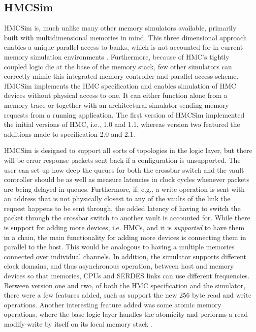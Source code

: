\subsection{HMCSim} \label{HMC-Sim}
HMCSim is, much unlike many other memory simulators available, primarily built with multidimensional memories in mind. This three dimensional approach enables a unique parallel access to banks, which is not accounted for in current memory simulation environments \cite{6969550}. Furthermore, because of HMC's tightly coupled logic die at the base of the memory stack, few other simulators can correctly mimic this integrated memory controller and parallel access scheme. HMCSim implements the HMC specification and enables simulation of HMC devices without physical access to one. It can either function alone from a memory trace or together with an architectural simulator sending memory requests from a running application. The first version of HMCSim implemented the initial versions of HMC, i.e., 1.0 and 1.1, whereas version two featured the additions made to specification 2.0 and 2.1.
\bigskip

HMCSim is designed to support all sorts of topologies in the logic layer, but there will be error response packets sent back if a configuration is unsupported. The user can set up how deep the queues for both the crossbar switch and the vault controller should be as well as measure latencies in clock cycles whenever packets are being delayed in queues. Furthermore, if, e.g., a write operation is sent with an address that is not physically closest to any of the vaults of the link the request happens to be sent through, the added latency of having to switch the packet through the crossbar switch to another vault is accounted for. While there is support for adding more devices, i.e. HMCs, and it is \emph{supported} to have them in a chain, the main functionality for adding more devices is connecting them in parallel to the host. This would be analogous to having a multiple memories connected over individual channels. In addition, the simulator supports different clock domains, and thus asynchronous operation, between host and memory devices so that memories, CPUs and SERDES links can use different frequencies. Between version one and two, of both the HMC specification and the simulator, there were a few features added, such as support the new 256 byte read and write operations. Another interesting feature added was some atomic memory operations, where the base logic layer handles the atomicity and performs a read-modify-write by itself on its local memory stack \cite{7529923}.
\bigskip

